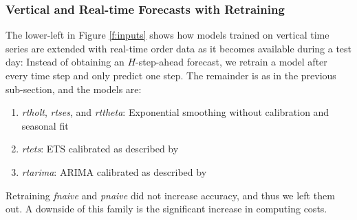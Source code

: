 \subsubsection{Vertical and Real-time Forecasts with Retraining}
\label{rt}

The lower-left in Figure \ref{f:inputs} shows how models trained on vertical
    time series are extended with real-time order data as it becomes available
    during a test day:
Instead of obtaining an $H$-step-ahead forecast, we retrain a model after
    every time step and only predict one step.
The remainder is as in the previous sub-section, and the models are:
\begin{enumerate}
\item \textit{\gls{rtholt}},
      \textit{\gls{rtses}}, and
      \textit{\gls{rttheta}}:
          Exponential smoothing without calibration and seasonal fit
\item \textit{\gls{rtets}}:
          ETS calibrated as described by \cite{hyndman2008b}
\item \textit{\gls{rtarima}}:
          ARIMA calibrated as described by \cite{hyndman2008a}
\end{enumerate}
Retraining \textit{fnaive} and \textit{pnaive} did not increase accuracy, and
    thus we left them out.
A downside of this family is the significant increase in computing costs.
